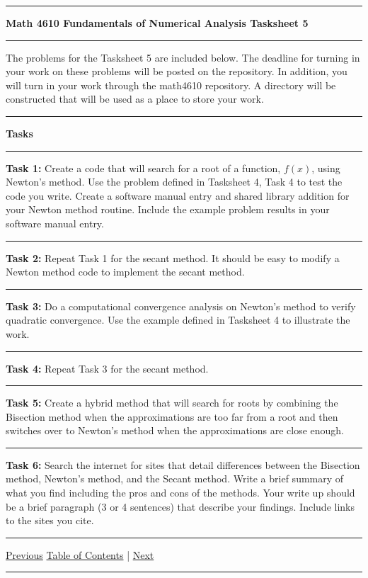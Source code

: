 \documentclass[10pt,fleqn]{article}
\begin{document}
\vskip0.1in\hrule\vskip0.1in \noindent
{\bf{\Large Math 4610 Fundamentals of Numerical Analysis Tasksheet 5}}
\vskip0.1in\hrule\vskip0.1in \noindent
The problems for the Tasksheet 5 are included below. The deadline for turning
in your work on these problems will be posted on the repository. In addition,
you will turn in your work through the math4610 repository. A directory will be
constructed that will be used as a place to store your work.
\vskip0.1in\hrule\vskip0.1in \noindent
{\bf{\large Tasks}}
\vskip0.1in\hrule\vskip0.1in \noindent
\begin{trivlist}
  \item[\bf Task 1:]
    Create a code that will search for a root of a function, \(f(x)\), using
    Newton's method. Use the problem defined in Tasksheet 4, Task 4 to test the
    code you write. Create a software manual entry and shared library addition
    for your Newton method routine. Include the example problem results in your
    software manual entry.
\vskip0.1in\hrule\vskip0.1in \noindent
  \item[\bf Task 2:] Repeat Task 1 for the secant method. It should be easy to
    modify a Newton method code to implement the secant method.
\vskip0.1in\hrule\vskip0.1in \noindent
  \item[\bf Task 3:] Do a computational convergence analysis on Newton's method
    to verify quadratic convergence. Use the example defined in Tasksheet 4 to
    illustrate the work. 
\vskip0.1in\hrule\vskip0.1in \noindent
  \item[\bf Task 4:] Repeat Task 3 for the secant method.
\vskip0.1in\hrule\vskip0.1in \noindent
  \item[\bf Task 5:] Create a hybrid method that will search for roots by
    combining the Bisection method when the approximations are too far from a
    root and then switches over to Newton's method when the approximations are
    close enough.
\vskip0.1in\hrule\vskip0.1in \noindent
  \item[\bf Task 6:] Search the internet for sites that detail differences
    between the Bisection method, Newton's method, and the Secant method. Write
    a brief summary of what you find including the pros and cons of the methods.
    Your write up should be a brief paragraph (3 or 4 sentences) that describe
    your findings. Include links to the sites you cite.
\end{trivlist}
\vskip0.1in\hrule\vskip0.1in \noindent
  \href{../../tasksheet_04/html/tasksheet_04.html}{Previous}
  \href{../../toc/md/tasksheet_toc.md}{Table of Contents} |
  \href{../../tasksheet_06/html/tasksheet_06.html}{Next}
\vskip0.1in\hrule\vskip0.1in \noindent
\end{document}
